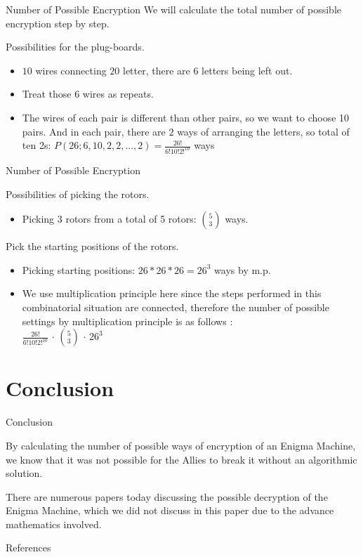 \documentclass{beamer}
\begin{document}
\begin{frame}{Number of Possible Encryption}
We will calculate the total number of possible encryption step by step.
\par Possibilities for the plug-boards.
\begin{itemize}
    \item $10$ wires connecting $20$ letter, there are 6 letters being left out. 
    \item Treat those 6 wires as repeats. 
    \item The wires of each pair is different than other pairs, so we want to choose 10 pairs. And in each pair, there are $2$ ways of arranging the letters, so total of ten 2s: $P(26; 6, 10, 2, 2, ... , 2) = \frac{26!}{6!10!2!^{10}}$ ways
\end{itemize}
\end{frame}

\begin{frame}{Number of Possible Encryption}
\par Possibilities of picking the rotors.
\begin{itemize}
    \item Picking 3 rotors from a total of 5 rotors: ${5}\choose{3}$ ways. 
\end{itemize}
\par Pick the starting positions of the rotors.
\begin{itemize}
    \item Picking starting positions: $26 * 26 * 26 = 26^{3}$ ways by m.p.
    \item We use multiplication principle here since the steps performed in this combinatorial situation are connected, therefore the number of possible settings by multiplication principle is as follows \cite{cac}: \\
        $\frac{26!}{6!10!2!^{10}}$ $\cdot$ ${5}\choose{3}$ $\cdot$ $26^{3}$
\end{itemize}
\end{frame}

\section{Conclusion}
\begin{frame}{Conclusion}
    \par By calculating the number of possible ways of encryption of an Enigma Machine, we know that it was not possible for the Allies to break it without an algorithmic solution. 
    \par There are numerous papers today discussing the possible decryption of the Enigma Machine, which we did not discuss in this paper due to the advance mathematics involved. 
\end{frame}

\begin{frame}{References}


\end{frame}
\end{document}
